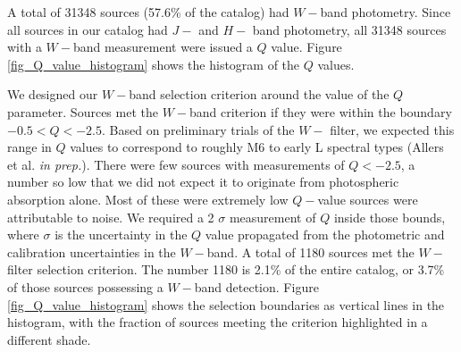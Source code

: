 A total of 31348 sources (57.6\% of the catalog) had $W-$band photometry.  Since all sources in our catalog had $J-$ and $H-$ band photometry, all 31348 sources with a $W-$band measurement were issued a $Q$ value.  Figure \ref{fig_Q_value_histogram} shows the histogram of the $Q$ values.

We designed our $W-$band selection criterion around the value of the $Q$ parameter. Sources met the $W-$band criterion if they were within the boundary $-0.5<Q<-2.5$.  Based on preliminary trials of the $W-$ filter, we expected this range in $Q$ values to correspond to roughly M6 to early L spectral types (Allers et al. \emph{in prep.}).  There were few sources with measurements of $Q<-2.5$, a number so low that we did not expect it to originate from photospheric absorption alone.  Most of these were extremely low $Q-$value sources were attributable to noise.  We required a 2 $\sigma$ measurement of $Q$ inside those bounds, where $\sigma$ is the uncertainty in the $Q$ value propagated from the photometric and calibration uncertainties in the $W-$band.  A total of 1180 sources met the $W-$filter selection criterion.  The number 1180 is 2.1\% of the entire catalog, or 3.7\% of those sources possessing a $W-$band detection.  Figure \ref{fig_Q_value_histogram} shows the selection boundaries as vertical lines in the histogram, with the fraction of sources meeting the criterion highlighted in a different shade.  

